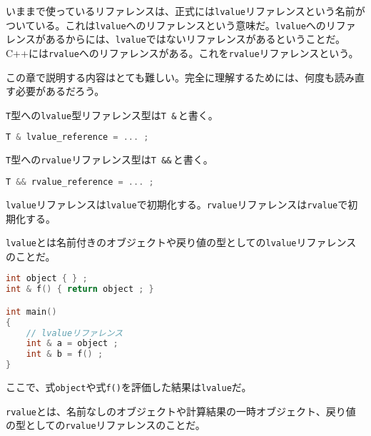 \ifTombow{}\fi
{}


いままで使っているリファレンスは、正式には\texttt{lvalue}リファレンスという名前がついている。これは\texttt{lvalue}へのリファレンスという意味だ。\texttt{lvalue}へのリファレンスがあるからには、\texttt{lvalue}ではないリファレンスがあるということだ。C++には\texttt{rvalue}へのリファレンスがある。これを\texttt{rvalue}リファレンスという。

この章で説明する内容はとても難しい。完全に理解するためには、何度も読み直す必要があるだろう。


\texttt{T}型への\texttt{lvalue}型リファレンス型は\texttt{T \&}\,と書く。

\begin{lstlisting}[language={C++}]
T & lvalue_reference = ... ;
\end{lstlisting}

\texttt{T}型への\texttt{rvalue}リファレンス型は\texttt{T \&\&}\,と書く。

\begin{lstlisting}[language={C++}]
T && rvalue_reference = ... ;
\end{lstlisting}

\texttt{lvalue}リファレンスは\texttt{lvalue}で初期化する。\texttt{rvalue}リファレンスは\texttt{rvalue}で初期化する。

\texttt{lvalue}とは名前付きのオブジェクトや戻り値の型としての\texttt{lvalue}リファレンスのことだ。

\ifTombow\pagebreak\fi
\begin{lstlisting}[language={C++}]
int object { } ;
int & f() { return object ; }

int main()
{
    // lvalueリファレンス
    int & a = object ;
    int & b = f() ;
}
\end{lstlisting}

ここで、式\texttt{object}や式\texttt{f()}を評価した結果は\texttt{lvalue}だ。

\texttt{rvalue}とは、名前なしのオブジェクトや計算結果の一時オブジェクト、戻り値の型としての\texttt{rvalue}リファレンスのことだ。

